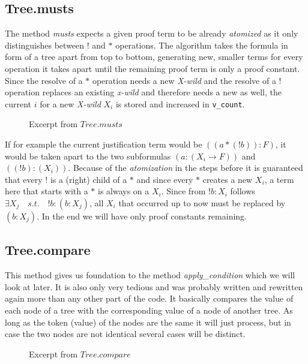 \subsection{Tree.musts}
The method \emph{musts} expects a given proof term to be already \emph{atomized} as it only distinguishes between $!$ and $*$ operations.
The algorithm takes the formula in form of a tree apart from top to bottom, generating new, smaller terms for every operation it takes apart until the remaining proof term is only a proof constant. Since the resolve of a $*$ operation needs a new \emph{X-wild} and the resolve of a $!$ operation replaces an existing \emph{x-wild} and therefore needs a new as well, the current $i$ for a new \emph{X-wild} $X_i$ is stored and increased in \texttt{v\_count}.

\begin{figure}[H]
    \vspace{-10pt}
	
	\vspace{-10pt}
	\caption{Excerpt from $Tree.musts$}
	\vspace{-10pt}
\end{figure}

If for example the current justification term would be $((a*(!b)):F)$, it would be taken apart to the two subformulas $(a:(X_i\rightarrow F))$ and $((!b):(X_i))$. Because of the \emph{atomization} in the steps before it is guaranteed that every $!$ is a (right) child of a  $*$ and since every $*$ creates a new $X_i$, a term here that starts with a $*$ is always on a $X_i$. Since from $!b:X_i$ follows $\exists X_j \quad s.t. \quad !b:(b:X_j)$, all $X_i$ that occurred up to now must be replaced by $(b:X_j)$. In the end we will have only proof constants remaining.

\subsection{Tree.compare}
This method gives us foundation to the method \emph{apply\_condition} which we will look at later. It is also only very tedious and was probably written and rewritten again more than any other part of the code. It basically compares the value of each node of a tree with the corresponding value of a node of another tree. As long as the token (value) of the nodes are the same it will just process, but in case the two nodes are not identical several cases will be distinct.


\begin{figure}[H]
	\vspace{-10pt}
	
	\vspace{-10pt}
\end{figure}
\begin{figure}[H]
	\vspace{-10pt}
	
	\vspace{-10pt}
	\caption{Excerpt from $Tree.compare$}
	\vspace{-10pt}
\end{figure}

